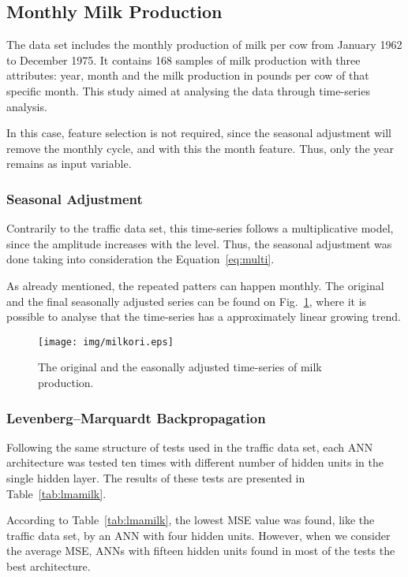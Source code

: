 \subsection{Monthly Milk Production}

The data set includes the monthly production of milk per cow from January 1962 to December 1975. It contains 168 samples of milk production with three attributes: year, month and the milk production in pounds per cow of that specific month. This study aimed at analysing the data through time-series analysis.

In this case, feature selection is not required, since the seasonal adjustment will remove the monthly cycle, and with this the month feature. Thus, only the year remains as input variable.

\subsubsection{Seasonal Adjustment}

Contrarily to the traffic data set, this time-series follows a multiplicative model, since the amplitude increases with the level. Thus, the seasonal adjustment was done taking into consideration the Equation~\eqref{eq:multi}.

As already mentioned, the repeated patters can happen monthly. The original and the final seasonally adjusted series can be found on Fig.~\ref{fig:milkori}, where it is possible to analyse that the time-series has a approximately linear growing trend.

\begin{figure}[htbp]
  \centering
\texttt{[image: img/milkori.eps]}
  \caption{The original and the easonally adjusted time-series of milk production.}
  \label{fig:milkori}
\end{figure}

\subsubsection{Levenberg--Marquardt Backpropagation}

Following the same structure of tests used in the traffic data set, each ANN architecture was tested ten times with different number of hidden units in the single hidden layer. The results of these tests are presented in Table~\ref{tab:lmamilk}.

According to Table~\ref{tab:lmamilk}, the lowest MSE value was found, like the traffic data set, by an ANN with four hidden units. However, when we consider the average MSE, ANNs with fifteen hidden units found in most of the tests the best architecture. 

